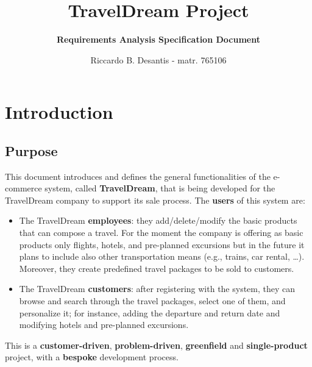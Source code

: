 \documentclass[a4paper,12pt]{book}
\begin{document}
\title{\textbf{TravelDream Project}}
\author{\textbf{Requirements Analysis Specification Document}}
\date{Riccardo B. Desantis - matr. 765106}

\maketitle

\tableofcontents

\chapter{Introduction}

\section{Purpose}
This document introduces and defines the general functionalities of the e-commerce system, called \textbf{TravelDream}, that is being developed for the TravelDream company to support its sale process. The \textbf{users} of this system are:
\begin{itemize}
  \item The TravelDream \textbf{employees}: they add/delete/modify the basic products that can compose a travel. For the moment the company is offering as basic products only flights, hotels, and pre-planned excursions but in the future it plans to include also other transportation means (e.g., trains, car rental, \dots). Moreover, they create predefined travel packages to be sold to customers.
  \item The TravelDream \textbf{customers}: after registering with the system, they can browse and search through the travel packages, select one of them, and personalize it; for instance, adding the departure and return date and modifying hotels and pre-planned excursions.
\end{itemize}

This is a \textbf{customer-driven}, \textbf{problem-driven}, \textbf{greenfield} and \textbf{single-product} project, with a \textbf{bespoke} development process.\newline
\end{document}
